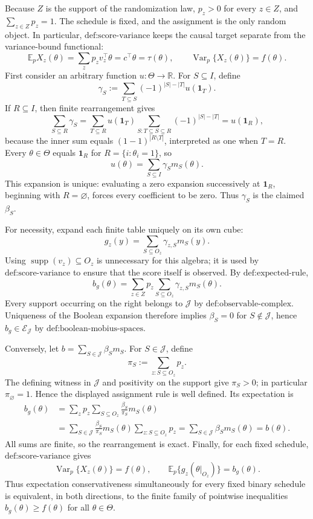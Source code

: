 Because \(Z\) is the support of the randomization law, \(p_z>0\) for every \(z\in Z\), and \(\sum_{z\in Z}p_z=1\).  The schedule is fixed, and the assignment is the only random object.  In particular, \(\text{def:score-variance}\) keeps the causal target separate from the variance-bound functional:
\[
 \mathbb E_pX_z(\theta)=\sum_zp_zv_z^\top\theta
 =c^\top\theta=\tau(\theta),\qquad
 \operatorname{Var}_p\{X_z(\theta)\}=f(\theta).
\]
First consider an arbitrary function \(u:\Theta\to\mathbb R\).  For \(S\subseteq I\), define
\[
 \gamma_S:=\sum_{T\subseteq S}(-1)^{|S|-|T|}u(\mathbf 1_T).
\]
If \(R\subseteq I\), then finite rearrangement gives
\[
 \sum_{S\subseteq R}\gamma_S
 =\sum_{T\subseteq R}u(\mathbf 1_T)
   \sum_{S:T\subseteq S\subseteq R}(-1)^{|S|-|T|}
 =u(\mathbf 1_R),
\]
because the inner sum equals \((1-1)^{|R\setminus T|}\), interpreted as one when \(T=R\).  Every \(\theta\in\Theta\) equals \(\mathbf 1_R\) for \(R=\{i:\theta_i=1\}\), so
\[
 u(\theta)=\sum_{S\subseteq I}\gamma_Sm_S(\theta).
\]
This expansion is unique: evaluating a zero expansion successively at \(\mathbf 1_R\), beginning with \(R=\varnothing\), forces every coefficient to be zero.  Thus \(\gamma_S\) is the claimed \(\beta_S\).

For necessity, expand each finite table uniquely on its own cube:
\[
 g_z(y)=\sum_{S\subseteq O_z}\gamma_{z,S}m_S(y).
\]
Using \(\operatorname{supp}(v_z)\subseteq O_z\) is unnecessary for this algebra; it is used by \(\text{def:score-variance}\) to ensure that the score itself is observed.  By \(\text{def:expected-rule}\),
\[
 b_g(\theta)=\sum_{z\in Z}p_z\sum_{S\subseteq O_z}
       \gamma_{z,S}m_S(\theta).
\]
Every support occurring on the right belongs to \(\mathcal J\) by \(\text{def:observable-complex}\).  Uniqueness of the Boolean expansion therefore implies \(\beta_S=0\) for \(S\notin\mathcal J\), hence \(b_g\in\mathcal E_{\mathcal J}\) by \(\text{def:boolean-mobius-spaces}\).

Conversely, let \(b=\sum_{S\in\mathcal J}\beta_Sm_S\).  For \(S\in\mathcal J\), define
\[
 \pi_S:=\sum_{z:S\subseteq O_z}p_z.
\]
The defining witness in \(\mathcal J\) and positivity on the support give \(\pi_S>0\); in particular \(\pi_\varnothing=1\).  Hence the displayed assignment rule is well defined.  Its expectation is
\[
 \begin{aligned}
 b_g(\theta)
 &=\sum_zp_z\sum_{S\subseteq O_z}\frac{\beta_S}{\pi_S}m_S(\theta)\\
 &=\sum_{S\in\mathcal J}\frac{\beta_S}{\pi_S}m_S(\theta)
     \sum_{z:S\subseteq O_z}p_z
 =\sum_{S\in\mathcal J}\beta_Sm_S(\theta)=b(\theta).
 \end{aligned}
\]
All sums are finite, so the rearrangement is exact.  Finally, for each fixed schedule, \(\text{def:score-variance}\) gives
\[
 \operatorname{Var}_p\{X_z(\theta)\}=f(\theta),
 \quad\quad \mathbb E_p\{g_z(\theta|_{O_z})\}=b_g(\theta).
\]
Thus expectation conservativeness simultaneously for every fixed binary schedule is equivalent, in both directions, to the finite family of pointwise inequalities \(b_g(\theta)\ge f(\theta)\) for all \(\theta\in\Theta\).


